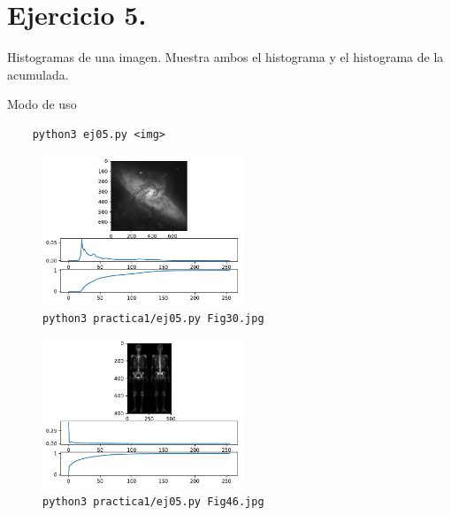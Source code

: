 \documentclass[11pt, spanish]{article}
\begin{document}
\section{Ejercicio 5.}
Histogramas de una imagen. Muestra ambos el histograma y el histograma de la acumulada.

Modo de uso
\begin{verbatim}
    python3 ej05.py <img>
\end{verbatim}

\begin{figure}[H]
\centering
  \includegraphics[width=6cm]{informe-imgs/ej05-1.pdf}
  \caption{\texttt{python3 practica1/ej05.py Fig30.jpg}}
\end{figure}

\begin{figure}[H]
\centering
  \includegraphics[width=6cm]{informe-imgs/ej05-2.pdf}
  \caption{\texttt{python3 practica1/ej05.py Fig46.jpg}}
\end{figure}
\end{document}
